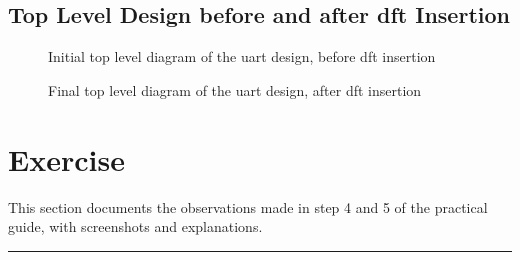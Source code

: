 \documentclass[a4paper,11pt]{article}%
\begin{document}
\pagebreak
\subsection{Top Level Design before and after \ac{dft} Insertion}

\begin{figure}[h]
	\centering
	\caption{Initial top level diagram of the \ac{uart} design,  before \ac{dft} insertion}
	\label{fig:init_top_level}
\end{figure}

\begin{figure}[h]
	\centering
	\caption{Final top level diagram of the \ac{uart} design, after \ac{dft} insertion}
	\label{fig:final_top_level}
\end{figure}

\pagebreak
\section{Exercise}
This section documents the observations made in step 4 and 5 of the practical guide, with screenshots and explanations.\\


\vfill
\hrule
{\small


}
\end{document}
